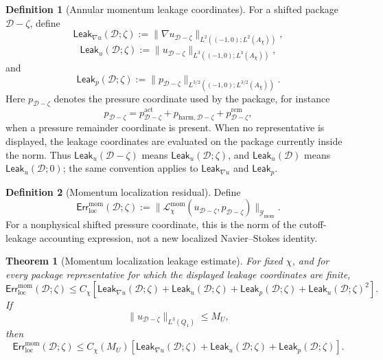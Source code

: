 \documentclass[11pt]{article}
\numberwithin{equation}{section}
\newtheorem{theorem}{Theorem}[section]
\theoremstyle{definition}
\newtheorem{definition}[definition]{Definition}
\theoremstyle{remark}
\newcommand{\loc}{\mathrm{loc}}
\newcommand{\mom}{\mathrm{mom}}
\newcommand{\harm}{\mathrm{harm}}
\newcommand{\Err}{\mathsf{Err}}
\newcommand{\Leak}{\mathsf{Leak}}
\newcommand{\calD}{\mathcal D}
\newcommand{\Ymom}{\mathcal Y_{\mom}}
\newcommand{\Qone}{Q_1}
\begin{document}
\begin{definition}[Annular momentum leakage coordinates]
\label{loc:def:annular-momentum-leakage}
For a shifted package \(\calD-\zeta\), define
\[
    \Leak_{\nabla u}(\calD;\zeta)
    :=
    \|\nabla u_{\calD-\zeta}\|_{L^2((-1,0);L^2(A_\chi))},
\]
\[
    \Leak_u(\calD;\zeta)
    :=
    \|u_{\calD-\zeta}\|_{L^3((-1,0);L^3(A_\chi))},
\]
and
\[
    \Leak_p(\calD;\zeta)
    :=
    \|p_{\calD-\zeta}\|_{L^{3/2}((-1,0);L^{3/2}(A_\chi))}.
\]
Here \(p_{\calD-\zeta}\) denotes the pressure coordinate used by the package,
for instance
\[
    p_{\calD-\zeta}
    =
    p^{\mathrm{act}}_{\calD-\zeta}
    +
    p_{\harm,\calD-\zeta}
    +
    p^{\mathrm{rem}}_{\calD-\zeta},
\]
when a pressure remainder coordinate is present.
When no representative is displayed, the leakage coordinates are evaluated on
the package currently inside the norm.  Thus \(\Leak_u(\calD-\zeta)\) means
\(\Leak_u(\calD;\zeta)\), and \(\Leak_u(\calD)\) means
\(\Leak_u(\calD;0)\); the same convention applies to \(\Leak_{\nabla u}\) and
\(\Leak_p\).
\end{definition}

\begin{definition}[Momentum localization residual]
\label{loc:def:momentum-localization-residual}
Define
\[
    \Err_{\loc}^{\mom}(\calD;\zeta)
    :=
    \|\mathcal L_\chi^{\mom}(u_{\calD-\zeta},p_{\calD-\zeta})\|_{\Ymom}.
\]
For a nonphysical shifted pressure coordinate, this is the norm of the
cutoff-leakage accounting expression, not a new localized Navier--Stokes
identity.
\end{definition}

\begin{theorem}[Momentum localization leakage estimate]
\label{loc:thm:momentum-localization-leakage}
For fixed \(\chi\), and for every package representative for which the
displayed leakage coordinates are finite,
\[
    \Err_{\loc}^{\mom}(\calD;\zeta)
    \le
    C_\chi
    \left[
        \Leak_{\nabla u}(\calD;\zeta)
        +
        \Leak_u(\calD;\zeta)
        +
        \Leak_p(\calD;\zeta)
        +
        \Leak_u(\calD;\zeta)^2
    \right].
\]
If
\[
    \|u_{\calD-\zeta}\|_{L^3(\Qone)}\le M_U,
\]
then
\[
    \Err_{\loc}^{\mom}(\calD;\zeta)
    \le
    C_\chi(M_U)
    \left[
        \Leak_{\nabla u}(\calD;\zeta)
        +
        \Leak_u(\calD;\zeta)
        +
        \Leak_p(\calD;\zeta)
    \right].
\]
\end{theorem}
\end{document}
